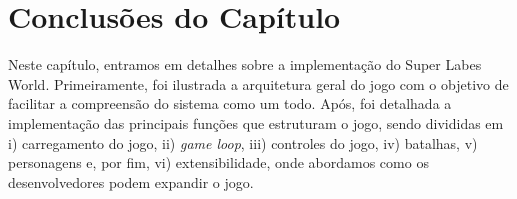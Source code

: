 \clearpage
\section{Conclusões do Capítulo}
Neste capítulo, entramos em detalhes sobre a implementação do Super Labes World. Primeiramente, foi ilustrada a arquitetura geral do jogo com o objetivo de facilitar a compreensão do sistema como um todo. Após, foi detalhada a implementação das principais funções que estruturam o jogo, sendo divididas em i) carregamento do jogo, ii) \textit{game loop}, iii) controles do jogo, iv) batalhas, v) personagens e, por fim, vi) extensibilidade, onde abordamos como os desenvolvedores podem expandir o jogo.

